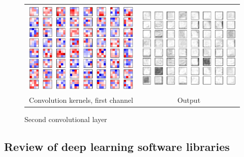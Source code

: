 \documentclass[a4paper, 11pt, table]{article}
\begin{document}
\begin{figure}[H]
\begin{tabular}{cc}
	\includegraphics[scale=0.4]{conv_layers/filters2.png} & \includegraphics[scale=0.4]{conv_layers/conv2.png} \\
	Convolution kernels, first channel & Output \\[6pt]

\end{tabular}
\caption{Second convolutional layer}
\end{figure}

\subsection{Review of deep learning software libraries}
\end{document}
